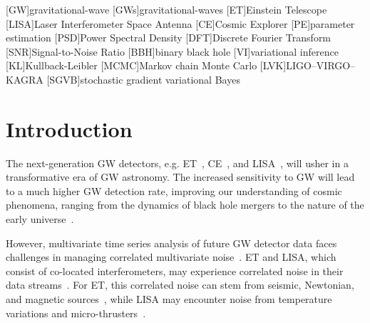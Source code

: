 \documentclass[%
 reprint,
 amsmath,amssymb,
 aps,
 nofootinbib,
]{revtex4-2}
\begin{document}
\maketitle


\begin{acronym}
    [GW]{gravitational-wave}
    [GWs]{gravitational-waves}
    [ET]{Einstein Telescope}
    [LISA]{Laser Interferometer Space Antenna}
    [CE]{Cosmic Explorer}
    [PE]{parameter estimation}
    [PSD]{Power Spectral Density}
    [DFT]{Discrete Fourier Transform}
    [SNR]{Signal-to-Noise Ratio}
    [BBH]{binary black hole}
    [VI]{variational inference}
    [KL]{Kullback-Leibler}
    [MCMC]{Markov chain Monte Carlo}
    [LVK]{LIGO--VIRGO--KAGRA}
    [SGVB]{stochastic gradient variational Bayes}
\end{acronym}


\section{Introduction}

The next-generation \ac{GW} detectors, e.g. \ac{ET}~\cite{Punturo_2010}, \ac{CE}~\cite{CE_horizon_study}, and \ac{LISA}~\cite{LISA_science_case}, will usher in a transformative era of \ac{GW} astronomy. 
The increased sensitivity to \ac{GW} will lead to a much higher \ac{GW} detection rate, improving our understanding of cosmic phenomena, ranging from the dynamics of black hole mergers to the nature of the early universe~\cite{ET_science_case, Maggiore_2020_ET_science_case, Branchesi_2023_ET_science_case, CE_horizon_study, LISA_science_case}.

However, multivariate time series analysis of future GW detector data faces challenges in managing correlated multivariate noise~\cite{ET_design_report,LISA_red_book}.
\ac{ET} and \ac{LISA}, which consist of co-located interferometers, may experience correlated noise in their data streams~\cite{Janssens2023}. 
For \ac{ET}, this correlated noise can stem from seismic, Newtonian, and magnetic sources~\cite{Ball_lightning_strokes, Janssens_newtonian_seismic, Janssens_magnetic_noise}, while \ac{LISA}  may encounter noise from temperature variations and micro-thrusters~\cite{lisa_temp_noise,lisa_thrusters_noise}. 
\end{document}
